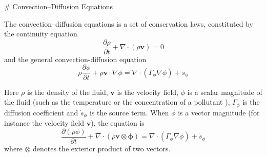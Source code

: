 # Convection--Diffusion Equations

The convection--diffusion equations is a set of conservation laws, constituted
by the continuity equation $$\frac{\partial \rho}{\partial t} + \nabla \cdot
(\rho \mathbf{v}) = 0$$ and the general convection-diffusion equation $$\rho
\frac{\partial \phi}{\partial t} + \rho \mathbf{v} \cdot \nabla \phi = \nabla
\cdot \left( \Gamma_\phi \nabla \phi \right) + \dot{s}_\phi$$ 

Here $\rho$ is the density of the fluid, $\mathbf{v}$ is the velocity field,
$\phi$ is a scalar magnitude of the fluid (such as the temperature or the
concentration of a pollutant ), $\Gamma_\phi$ is the diffusion coefficient and
$\dot{s}_\phi$ is the source term. When $\phi$ is a vector magnitude (for
instance the velocity field $\mathbf{v}$), the equation is $$\frac{\partial(\rho
\phi)}{\partial t} + \nabla \cdot (\rho \mathbf{v} \otimes \mathbf{\phi}) =
\nabla \cdot \left( \Gamma_\phi \nabla \phi \right) + \dot{s}_\phi$$ where
$\otimes$ denotes the exterior product of two vectors.

